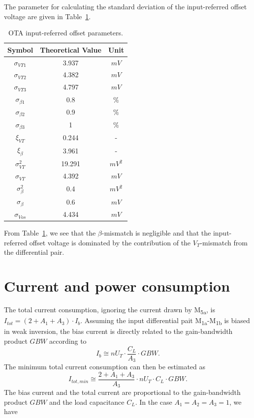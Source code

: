 \documentclass[
  a4paper,
  DIV=11,
  numbers=noendperiod]{scrreprt}
\begin{document}
The parameter for calculating the standard deviation of the
input-referred offset voltage are given in Table~\ref{tbl-offset}.

\begin{longtable}[]{@{}ccc@{}}

\caption{\label{tbl-offset}OTA input-referred offset parameters.}

\tabularnewline

\toprule\noalign{}
Symbol & Theoretical Value & Unit \\
\midrule\noalign{}
\endhead
\bottomrule\noalign{}
\endlastfoot
\(\sigma_{{VT1}}\) & 3.937 & \(mV\) \\
\(\sigma_{{VT2}}\) & 4.382 & \(mV\) \\
\(\sigma_{{VT3}}\) & 4.797 & \(mV\) \\
\(\sigma_{{\beta1}}\) & 0.8 & \(\%\) \\
\(\sigma_{{\beta2}}\) & 0.9 & \(\%\) \\
\(\sigma_{{\beta3}}\) & 1 & \(\%\) \\
\(\xi_{{VT}}\) & 0.244 & - \\
\(\xi_{{\beta}}\) & 3.961 & - \\
\(\sigma_{{VT}}^2\) & 19.291 & \(mV^2\) \\
\(\sigma_{{VT}}\) & 4.392 & \(mV\) \\
\(\sigma_{{\beta}}^2\) & 0.4 & \(mV^2\) \\
\(\sigma_{{\beta}}\) & 0.6 & \(mV\) \\
\(\sigma_{{Vos}}\) & 4.434 & \(mV\) \\

\end{longtable}

From Table~\ref{tbl-offset}, we see that the \(\beta\)-mismatch is
negligible and that the input-referred offset voltage is dominated by
the contribution of the \(V_T\)-mismatch from the differential pair.

\section{Current and power
consumption}\label{current-and-power-consumption}

The total current consumption, ignoring the current drawn by
M\textsubscript{5a}, is \(I_{tot} = (2+A_1+A_3) \cdot I_b\). Assuming
the input differential pait M\textsubscript{1a}-M\textsubscript{1b} is
biased in weak inversion, the bias current is directly related to the
gain-bandwidth product \(GBW\) according to \begin{equation}
  I_b \cong n U_T \cdot \frac{C_L}{A_3} \cdot GBW.
\end{equation} The minimum total current consumption can then be
estimated as \begin{equation}
  I_{tot,min} \cong \frac{2+A_1+A_3}{A_3} \cdot n U_T \cdot C_L \cdot GBW.
\end{equation} The bias current and the total current are proportional
to the gain-bandwidth product \(GBW\) and the load capacitance \(C_L\).
In the case \(A_1=A_2=A_3=1\), we have
\end{document}
